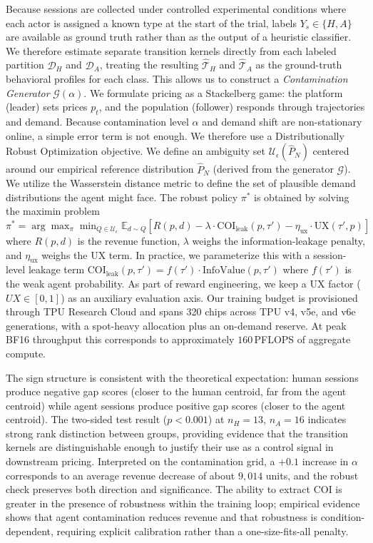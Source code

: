 \documentclass[10pt,letterpaper]{article}
\begin{document}
\vspace{0.5em}
Because sessions are collected under controlled experimental conditions where each actor is assigned a known type at the start of the trial, labels $Y_s \in \{H, A\}$ are available as ground truth rather than as the output of a heuristic classifier.
We therefore estimate separate transition kernels directly from each labeled partition $\mathcal{D}_H$ and $\mathcal{D}_A$, treating the resulting $\hat{\mathcal{T}}_H$ and $\hat{\mathcal{T}}_A$ as the ground-truth behavioral profiles for each class.
This allows us to construct a \textit{Contamination Generator} $\mathcal{G}(\alpha)$.
We formulate pricing as a Stackelberg game: the platform (leader) sets prices $p_t$, and the population (follower) responds through trajectories and demand.
Because contamination level $\alpha$ and demand shift are non-stationary online, a simple error term is not enough.
We therefore use a Distributionally Robust Optimization objective.
We define an ambiguity set $\mathcal{U}_\epsilon(\hat{P}_N)$ centered around our empirical reference distribution $\hat{P}_N$ (derived from the generator $\mathcal{G}$).
We utilize the Wasserstein distance metric to define the set of plausible demand distributions the agent might face.
The robust policy $\pi^*$ is obtained by solving the maximin problem $\pi^* = \arg \max_{\pi} \min_{Q \in \mathcal{U}_\epsilon} \mathbb{E}_{d \sim Q} \left[ R(p, d) - \lambda \cdot \text{COI}_{\text{leak}}(p,\tau') - \eta_{\text{ux}} \cdot \text{UX}(\tau', p) \right]$ where $R(p, d)$ is the revenue function, $\lambda$ weighs the information-leakage penalty, and $\eta_{\text{ux}}$ weighs the UX term.
In practice, we parameterize this with a session-level leakage term $\text{COI}_{\text{leak}}(p,\tau') = f(\tau')\cdot \text{InfoValue}(p,\tau')$ where $f(\tau')$ is the weak agent probability.
As part of reward engineering, we keep a UX factor ($UX\in[0,1]$) as an auxiliary evaluation axis.
Our training budget is provisioned through TPU Research Cloud and spans 320 chips across TPU v4, v5e, and v6e generations, with a spot-heavy allocation plus an on-demand reserve.
At peak BF16 throughput this corresponds to approximately $160$\,PFLOPS of aggregate compute.

\vspace{0.5em}
The sign structure is consistent with the theoretical expectation: human sessions produce negative gap scores (closer to the human centroid, far from the agent centroid) while agent sessions produce positive gap scores (closer to the agent centroid).
The two-sided test result ($p<0.001$) at $n_H=13$, $n_A=16$ indicates strong rank distinction between groups, providing evidence that the transition kernels are distinguishable enough to justify their use as a control signal in downstream pricing.
Interpreted on the contamination grid, a $+0.1$ increase in $\alpha$ corresponds to an average revenue decrease of about $9{,}014$ units, and the robust check preserves both direction and significance.
The ability to extract COI is greater in the presence of robustness within the training loop; empirical evidence shows that agent contamination reduces revenue and that robustness is condition-dependent, requiring explicit calibration rather than a one-size-fits-all penalty.
\end{document}
